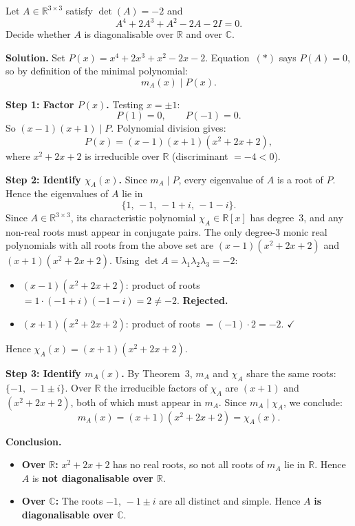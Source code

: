 \begin{exbox}
Let $A \in \mathbb{R}^{3\times 3}$ satisfy $\det(A) = -2$ and
\[
  A^4 + 2A^3 + A^2 - 2A - 2I = 0. \tag{$*$}
\]
Decide whether $A$ is diagonalisable over $\mathbb{R}$ and over $\mathbb{C}$.

\medskip
\textbf{Solution.}  Set $P(x) = x^4+2x^3+x^2-2x-2$.
Equation~$(*)$ says $P(A)=0$, so by definition of the minimal polynomial:
\[
  m_A(x) \mid P(x).
\]

\textbf{Step 1: Factor $P(x)$.}  Testing $x=\pm 1$:
\[
  P(1) = 0, \qquad P(-1) = 0.
\]
So $(x-1)(x+1)\mid P$.  Polynomial division gives:
\[
  P(x) = (x-1)(x+1)(x^2+2x+2),
\]
where $x^2+2x+2$ is irreducible over $\mathbb{R}$ (discriminant $= -4 < 0$).

\medskip
\textbf{Step 2: Identify $\chi_A(x)$.}  Since $m_A \mid P$, every eigenvalue
of $A$ is a root of $P$.  Hence the eigenvalues of $A$ lie in
\[
  \{1,\,-1,\,-1+i,\,-1-i\}.
\]
Since $A\in\mathbb{R}^{3\times 3}$, its characteristic polynomial $\chi_A\in\mathbb{R}[x]$
has degree~$3$, and any non-real roots must appear in conjugate pairs.
The only degree-$3$ monic real polynomials with all roots from the above
set are $(x-1)(x^2+2x+2)$ and $(x+1)(x^2+2x+2)$.  Using
$\det A = \lambda_1\lambda_2\lambda_3 = -2$:
\begin{itemize}[leftmargin=1.5em,itemsep=2pt]
  \item $(x-1)(x^2+2x+2)$: product of roots $= 1\cdot(-1+i)(-1-i) = 2
        \neq -2$. \quad\textbf{Rejected.}
  \item $(x+1)(x^2+2x+2)$: product of roots $= (-1)\cdot 2 = -2$.
        \quad$\checkmark$
\end{itemize}
Hence $\chi_A(x) = (x+1)(x^2+2x+2)$.

\medskip
\textbf{Step 3: Identify $m_A(x)$.}  By Theorem~3, $m_A$ and $\chi_A$ share
the same roots: $\{-1,\,-1\pm i\}$.  Over $\mathbb{R}$ the irreducible factors of
$\chi_A$ are $(x+1)$ and $(x^2+2x+2)$, both of which must appear in $m_A$.
Since $m_A\mid\chi_A$, we conclude:
\[
  m_A(x) = (x+1)(x^2+2x+2) = \chi_A(x).
\]

\medskip
\textbf{Conclusion.}
\begin{itemize}[leftmargin=1.5em,itemsep=3pt]
  \item \textbf{Over $\mathbb{R}$:}  $x^2+2x+2$ has no real roots, so not all roots
        of $m_A$ lie in $\mathbb{R}$.  Hence $A$ is \textbf{not diagonalisable
        over $\mathbb{R}$}.
  \item \textbf{Over $\mathbb{C}$:}  The roots $-1,\,-1\pm i$ are all distinct and
        simple.  Hence $A$ \textbf{is diagonalisable over $\mathbb{C}$}.
\end{itemize}
\end{exbox}

